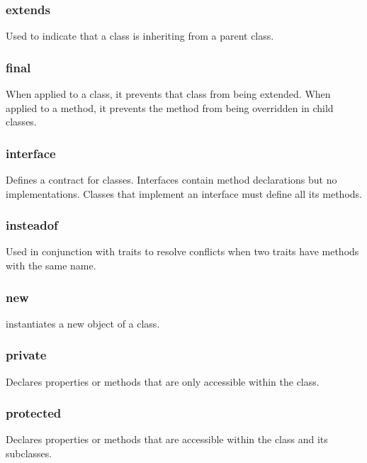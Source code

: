 \documentclass{report}
\begin{document}
    \bigbreak \noindent 
    \subsubsection{extends}
    \bigbreak \noindent 
    Used to indicate that a class is inheriting from a parent class.

    \bigbreak \noindent 
    \subsubsection{final}
    \bigbreak \noindent 
    When applied to a class, it prevents that class from being extended. When applied to a method, it prevents the method from being overridden in child classes.

    \bigbreak \noindent 
    \subsubsection{interface}
    \bigbreak \noindent 
    Defines a contract for classes. Interfaces contain method declarations but no implementations. Classes that implement an interface must define all its methods.

    \bigbreak \noindent 
    \subsubsection{insteadof}
    \bigbreak \noindent 
    Used in conjunction with traits to resolve conflicts when two traits have methods with the same name.

    \bigbreak \noindent 
    \subsubsection{new}
    \bigbreak \noindent 
    instantiates a new object of a class.

    \bigbreak \noindent 
    \subsubsection{private}
    \bigbreak \noindent 
    Declares properties or methods that are only accessible within the class.

    \bigbreak \noindent 
    \subsubsection{protected}
    \bigbreak \noindent 
    Declares properties or methods that are accessible within the class and its subclasses.
\end{document}
